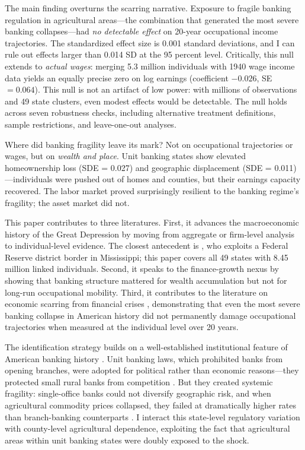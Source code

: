 \documentclass[12pt]{article}
\begin{document}
The main finding overturns the scarring narrative. Exposure to fragile banking regulation in agricultural areas---the combination that generated the most severe banking collapses---had \textit{no detectable effect} on 20-year occupational income trajectories. The standardized effect size is 0.001 standard deviations, and I can rule out effects larger than 0.014 SD at the 95 percent level. Critically, this null extends to \textit{actual wages}: merging 5.3 million individuals with 1940 wage income data yields an equally precise zero on log earnings (coefficient $-0.026$, SE $= 0.064$). This null is not an artifact of low power: with millions of observations and 49 state clusters, even modest effects would be detectable. The null holds across seven robustness checks, including alternative treatment definitions, sample restrictions, and leave-one-out analyses.

Where did banking fragility leave its mark? Not on occupational trajectories or wages, but on \textit{wealth and place}. Unit banking states show elevated homeownership loss (SDE = 0.027) and geographic displacement (SDE = 0.011)---individuals were pushed out of homes and counties, but their earnings capacity recovered. The labor market proved surprisingly resilient to the banking regime's fragility; the asset market did not.

This paper contributes to three literatures. First, it advances the macroeconomic history of the Great Depression by moving from aggregate or firm-level analysis \citep{fishback2005, lee2022, benmelech2019} to individual-level evidence. The closest antecedent is \citet{ziebarth2013}, who exploits a Federal Reserve district border in Mississippi; this paper covers all 49 states with 8.45 million linked individuals. Second, it speaks to the finance-growth nexus \citep{rajan1998, jayaratne1996} by showing that banking structure mattered for wealth accumulation but not for long-run occupational mobility. Third, it contributes to the literature on economic scarring from financial crises \citep{mian2014, chodorow2014}, demonstrating that even the most severe banking collapse in American history did not permanently damage occupational trajectories when measured at the individual level over 20 years.

The identification strategy builds on a well-established institutional feature of American banking history \citep{calomiris2014, calomiris1998}. Unit banking laws, which prohibited banks from opening branches, were adopted for political rather than economic reasons---they protected small rural banks from competition \citep{kroszner1999}. But they created systemic fragility: single-office banks could not diversify geographic risk, and when agricultural commodity prices collapsed, they failed at dramatically higher rates than branch-banking counterparts \citep{wheelock1995, mitchener2005, carlson2011}. I interact this state-level regulatory variation with county-level agricultural dependence, exploiting the fact that agricultural areas within unit banking states were doubly exposed to the shock.
\end{document}
